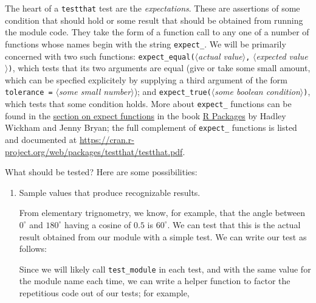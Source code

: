 \documentclass{article}\usepackage[]{graphicx}\usepackage[]{color}
\newcommand{\Rcode}[1]{\lstinline[style=Rstyle]{#1}}
\newcommand{\placeholder}[1]{$\langle$\textrm{\textit{#1}}$\rangle$}
\begin{document}
\begin{enumerate}
  The heart of a \Rcode{testthat} test are the \emph{expectations}.
  These are assertions of some condition that should hold or some
  result that should be obtained from running the module code.  They
  take the form of a function call to any one of a number of functions
  whose names begin with the string \Rcode{expect_}.  We will be
  primarily concerned with two such functions:
  \Rcode{expect_equal(}\placeholder{actual value}\Rcode{,}
  \placeholder{expected value}\Rcode{)}, which tests that its two
  arguments are equal (give or take some small amount, which can be
  specfied explicitely by supplying a third argument of the form
  \Rcode{tolerance =} \placeholder{some small number}); and
  \Rcode{expect_true(}\placeholder{some boolean condition}\Rcode{)},
  which tests that some condition holds.  More about \Rcode{expect_}
  functions can be found in the
  \href{https://r-pkgs.org/tests.html#expectations}{section on expect
  functions} in the book \href{https://r-pkgs.org/}{R Packages} by
  Hadley Wickham and Jenny Bryan; the full complement of
  \Rcode{expect_} functions is listed and documented at
  \url{https://cran.r-project.org/web/packages/testthat/testthat.pdf}.

  What should be tested?  Here are some possibilities:

  \begin{enumerate}

  \item Sample values that produce recognizable results.

    From elementary trignometry, we know, for example, that the angle
    between $0^\circ$ and $180^\circ$ having a cosine of $0.5$ is
    $60^\circ$.  We can test that this is the actual result obtained
    from our module with a simple test.  We can write our test as
    follows:


    Since we will likely call \Rcode{test_module} in each test, and
    with the same value for the module name each time, we can write a
    helper function to factor the repetitious code out of our tests;
    for example,


\end{enumerate}
\end{enumerate}
\end{document}

